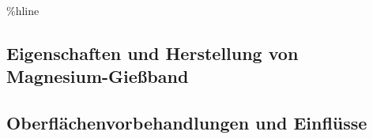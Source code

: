         \%hline


\subsection{Eigenschaften und Herstellung von Magnesium-Gießband}\label{subsec:eigherstellungmgband}

\subsection{Oberflächenvorbehandlungen und Einflüsse}\label{subsec:oberflächen}



